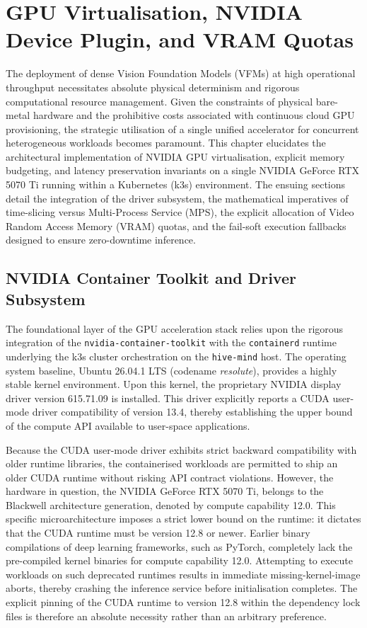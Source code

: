 \chapter{GPU Virtualisation, NVIDIA Device Plugin, and VRAM Quotas}
\label{ch:gpu_virtualisation}

The deployment of dense Vision Foundation Models (VFMs) at high operational throughput necessitates absolute physical determinism and rigorous computational resource management. Given the constraints of physical bare-metal hardware and the prohibitive costs associated with continuous cloud GPU provisioning, the strategic utilisation of a single unified accelerator for concurrent heterogeneous workloads becomes paramount. This chapter elucidates the architectural implementation of NVIDIA GPU virtualisation, explicit memory budgeting, and latency preservation invariants on a single NVIDIA GeForce RTX 5070 Ti running within a Kubernetes (k3s) environment. The ensuing sections detail the integration of the driver subsystem, the mathematical imperatives of time-slicing versus Multi-Process Service (MPS), the explicit allocation of Video Random Access Memory (VRAM) quotas, and the fail-soft execution fallbacks designed to ensure zero-downtime inference.

\section{NVIDIA Container Toolkit and Driver Subsystem}
\label{sec:container_toolkit_and_driver_subsystem}

The foundational layer of the GPU acceleration stack relies upon the rigorous integration of the \texttt{nvidia-container-toolkit} with the \texttt{containerd} runtime underlying the k3s cluster orchestration on the \texttt{hive-mind} host. The operating system baseline, Ubuntu 26.04.1 LTS (codename \textit{resolute}), provides a highly stable kernel environment. Upon this kernel, the proprietary NVIDIA display driver version 615.71.09 is installed. This driver explicitly reports a CUDA user-mode driver compatibility of version 13.4, thereby establishing the upper bound of the compute API available to user-space applications.

Because the CUDA user-mode driver exhibits strict backward compatibility with older runtime libraries, the containerised workloads are permitted to ship an older CUDA runtime without risking API contract violations. However, the hardware in question, the NVIDIA GeForce RTX 5070 Ti, belongs to the Blackwell architecture generation, denoted by compute capability 12.0. This specific microarchitecture imposes a strict lower bound on the runtime: it dictates that the CUDA runtime must be version 12.8 or newer. Earlier binary compilations of deep learning frameworks, such as PyTorch, completely lack the pre-compiled kernel binaries for compute capability 12.0. Attempting to execute workloads on such deprecated runtimes results in immediate missing-kernel-image aborts, thereby crashing the inference service before initialisation completes. The explicit pinning of the CUDA runtime to version 12.8 within the dependency lock files is therefore an absolute necessity rather than an arbitrary preference.

